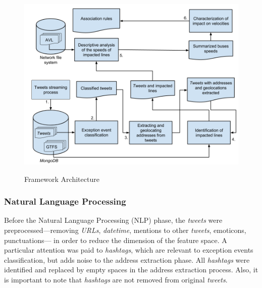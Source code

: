 \documentclass[runningheads]{llncs}
\begin{document}
\begin{figure}[!htb]
	\centering
 	  \caption{Framework Architecture}
		\includegraphics[width=0.7\linewidth]{caracterization_flow_en.png}
	\label{fig:caracterization_flow_en}
\end{figure}

\subsubsection{Natural Language Processing}
\label{nlp}

Before the Natural Language Processing (NLP) phase, the \textit{tweets} were preprocessed---removing \textit{URLs}, \textit{datetime}, mentions to other \textit{tweets}, emoticons, punctuations--- in order to reduce the dimension of the feature space. A particular attention was paid to \textit{hashtags}, which are relevant to exception events classification, but adds noise to the address extraction phase. All \textit{hashtags} were identified and replaced by empty spaces in the address extraction process. Also, it is important to note that \textit{hashtags} are not removed from original \textit{tweets}.
\end{document}
